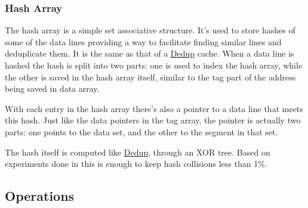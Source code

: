 \subsubsection{Hash Array}
\label{sssec:DedupBDIHash}
The hash array is a simple set associative structure. It's used to store hashes of some of the data lines providing a way to facilitate finding similar lines and deduplicate them. It is the same as that of a \hyperref[sssec:DedupHash]{Dedup} cache. When a data line is hashed the hash is split into two parts: one is used to index the hash array, while the other is saved in the hash array itself, similar to the tag part of the address being saved in data array.\par
With each entry in the hash array there's also a pointer to a data line that meets this hash. Just like the data pointers in the tag array, the pointer is actually two parts: one points to the data set, and the other to the segment in that set.\par
The hash itself is computed like \hyperref[sssec:DedupHash]{Dedup}, through an XOR tree. Based on experiments done in \cite{dedup} this is enough to keep hash collisions less than 1\%.

\subsection{Operations}
\label{ssec:DedupBDIOperations}
